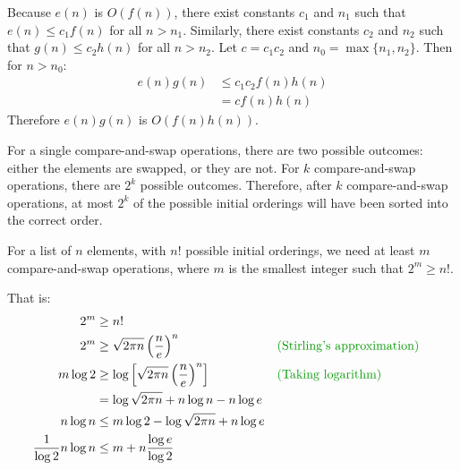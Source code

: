 \documentclass[12pt]{extarticle}
\begin{document}



Because $e(n)$ is $O(f(n))$, there exist constants $c_1$ and $n_1$ such that $e(n) \le c_1 f(n)$ for all $n > n_1$.
Similarly, there exist constants $c_2$ and $n_2$ such that $g(n) \le c_2 h(n)$ for all $n > n_2$.
Let $c = c_1 c_2$ and $n_0 = \max\{n_1, n_2\}$.
Then for $n > n_0$:
\begin{align*}
e(n)g(n) & \le c_1 c_2 f(n) h(n) \\
& = c f(n) h(n)
\end{align*}
Therefore $e(n)g(n)$ is $O(f(n)h(n))$.


For a single compare-and-swap operations, there are two possible outcomes: either the elements are swapped, or they are not.
For $k$ compare-and-swap operations, there are $2^k$ possible outcomes.
Therefore, after $k$ compare-and-swap operations, at most $2^k$ of the possible initial orderings will have been sorted into the correct order.

For a list of $n$ elements, with $n!$ possible initial orderings, we need at least $m$ compare-and-swap operations, where $m$ is the smallest integer such that $2^m \ge n!$.

That is:
\begin{align*}
2^m & \ge n! \\
2^m & \ge \sqrt{2\pi n} \left(\frac{n}{e}\right)^n && \expl{Stirling's approximation} \\
m \log 2 & \ge \log \left[\sqrt{2\pi n} \left(\frac{n}{e}\right)^n\right] && \expl{Taking logarithm} \\
& = \log \sqrt{2\pi n} + n \log n - n \log e \\
n \log n & \le m \log 2 - \log \sqrt{2\pi n} + n \log e \\
\frac{1}{\log 2} n \log n & \le m + n \frac{\log e}{\log 2} \\
\end{align*}
\end{document}
